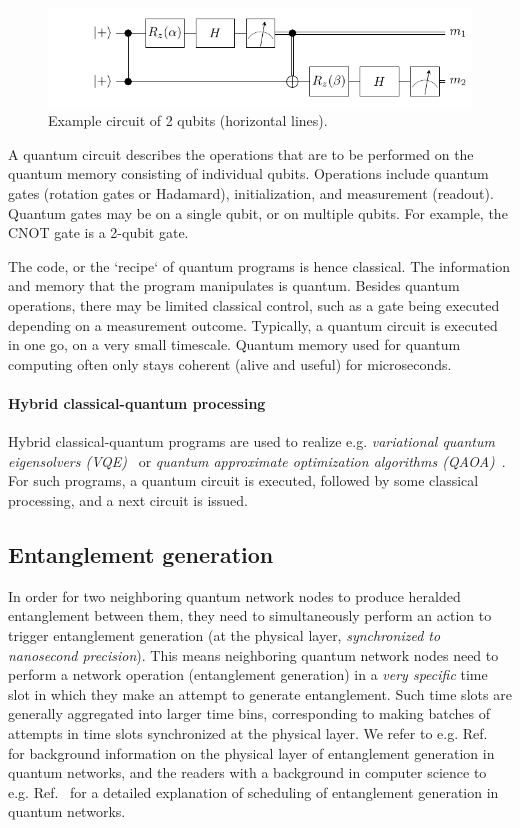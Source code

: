\begin{figure}[t]
    \centering
    \includegraphics[width=0.8\linewidth]{figures/background/example_circuit.pdf}
    \caption{
      Example circuit of 2 qubits (horizontal lines).
    }
    \label{fig:example_circuit}
\end{figure}


A quantum circuit describes the operations that are to be performed on the quantum memory consisting of individual qubits.
Operations include quantum gates (rotation gates or Hadamard), initialization, and measurement (readout).
Quantum gates may be on a single qubit, or on multiple qubits.
For example, the CNOT gate is a 2-qubit gate.

The code, or the `recipe` of quantum programs is hence classical.
The information and memory that the program manipulates is quantum.
Besides quantum operations, there may be limited classical control, such as a gate being executed depending on a measurement outcome.
Typically, a quantum circuit is executed in one go, on a very small timescale.
Quantum memory used for quantum computing  often only stays coherent (alive and useful) for microseconds.

\paragraph{Hybrid classical-quantum processing}
Hybrid classical-quantum programs are used to realize e.g. \textit{variational quantum eigensolvers (VQE)}~\cite{diadamo2021distributed, liu2022layer} or \textit{quantum approximate optimization algorithms (QAOA)}~\cite{farhi2014quantum}.
For such programs, a quantum circuit is executed, followed by some classical processing, and a next circuit is issued.

\subsection{Entanglement generation}
In order for two neighboring quantum network nodes to produce heralded entanglement between them, they need to simultaneously perform an action to trigger entanglement generation (at the physical layer, \emph{synchronized to nanosecond precision}).
This means neighboring quantum network nodes need to perform a network operation (entanglement generation) in a \emph{very specific} time slot in which they make an attempt to generate entanglement.
Such time slots are generally aggregated into larger time bins, corresponding to making batches of attempts in time slots synchronized at the physical layer.
We refer to e.g. Ref.~\cite{pompili_2022_experimental} for background information on the physical layer of entanglement generation in quantum networks, and the readers with a background in computer science to e.g. Ref.~\cite{dahlberg_2019_egp} for a detailed explanation of scheduling of entanglement generation in quantum networks.

